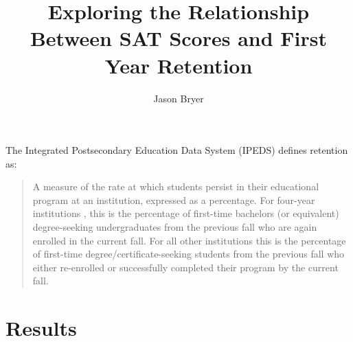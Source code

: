 \documentclass[letterpaper,doc]{apa6}
\title{Exploring the Relationship Between SAT Scores and First Year Retention}
\author{Jason Bryer}
\affiliation{Excelsior College}
\begin{document}

\maketitle                            

The Integrated Postsecondary Education Data System (IPEDS)  defines retention as:
\begin{quote}
A measure of the rate at which students persist in their educational program at an institution, expressed as a percentage. For four-year institutions , this is the percentage of first-time bachelors (or equivalent) degree-seeking undergraduates from the previous fall who are again enrolled in the current fall. For all other institutions this is the percentage of first-time degree/certificate-seeking students from the previous fall who either re-enrolled or successfully completed their program by the current fall.
\end{quote}

\section{Results}
\end{document}
